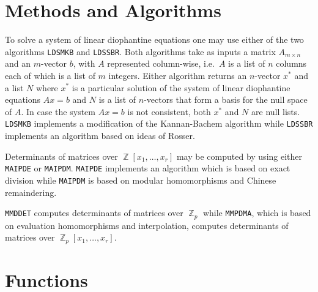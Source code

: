 \section{Methods and Algorithms}
To solve a system of linear diophantine equations one may use either
of the two algorithms {\tt LDSMKB} and {\tt LDSSBR}.  Both algorithms
take as inputs a matrix $A_{m \times n}$ and an $m$-vector $b$, with
$A$ represented column-wise, i.e.\ $A$ is a list of $n$ columns each
of which is a list of $m$ integers.  Either algorithm returns an
$n$-vector $x^*$ and a list $N$ where $x^*$ is a particular solution
of the system of linear diophantine equations $Ax = b$ and $N$ is a list of
$n$-vectors that form a basis for the null space of $A$.  In case the
system $Ax = b$ is not consistent, both $x^*$ and $N$ are null lists.
{\tt LDSMKB} implements a modification of the Kannan-Bachem algorithm
while {\tt LDSSBR} implements an algorithm based on ideas of Rosser.

Determinants of matrices over $\BbbZ[x_1,\ldots,x_r]$ may be computed
by using either {\tt MAIPDE} or {\tt MAIPDM}.  {\tt MAIPDE} implements
an algorithm which is based on exact division while {\tt MAIPDM} is
based on modular homomorphisms and Chinese remaindering.

{\tt MMDDET} computes determinants of matrices over $\BbbZ_p$ while
{\tt MMPDMA}, which is based on evaluation homomorphisms and
interpolation, computes determinants of matrices over
$\BbbZ_p[x_1,\ldots,x_r]$.

\section{Functions}

